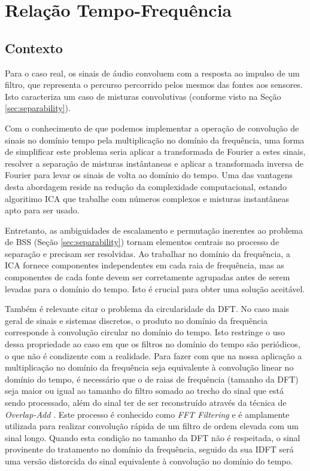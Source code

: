\label{chap:3}

\section{Relação Tempo-Frequência}
    
    \subsection{Contexto}
        Para o caso real, os sinais de áudio convoluem com a resposta ao impulso de um filtro, que representa o percurso percorrido pelos mesmos das fontes aos sensores. Isto caracteriza um caso de misturas convolutivas (conforme visto na Seção \ref{sec:separability}). 
        
        Com o conhecimento de que podemos implementar a operação de convolução de sinais no domínio tempo pela  multiplicação no domínio da frequência, uma forma de simplificar este problema seria aplicar a transformada de Fourier a estes sinais, resolver a separação de misturas instântaneas e aplicar a transformada inversa de Fourier para levar os sinais de volta ao domínio do tempo. Uma das vantagens desta abordagem reside na redução da complexidade computacional, estando algoritimo ICA que trabalhe com números complexos e misturas instantâneas apto para ser usado.
        
        Entretanto, as ambiguidades de escalamento e permutação inerentes ao problema de BSS (Seção \ref{sec:separability}) tornam elementos centrais no processo de separação e precisam ser resolvidas. Ao trabalhar no domínio da frequência, a ICA fornece componentes independentes em cada raia de frequência, mas as componentes de cada fonte devem ser corretamente agrupadas antes de serem levadas para o domínio do tempo. Isto é crucial para obter uma solução aceitável.
        
        Também é relevante citar o problema da circularidade da DFT. No caso mais geral de sinais e sistemas discretos, o produto no domínio da frequência corresponde à convolução circular no domínio do tempo. Isto restringe o uso dessa propriedade ao caso em que os filtros no domínio do tempo são periódicos, o que não é condizente com a realidade. Para fazer com que na nossa aplicação a multiplicação no domínio da frequência seja equivalente à convolução linear no domínio do tempo, é necessário que o de raias de frequência (tamanho da DFT) seja maior ou igual ao tamanho do filtro somado ao trecho do sinal que está sendo processado, além do sinal ter de ser reconstruído através da técnica de \textit{Overlap-Add} \cite{signalprocessing} . Este processo é conhecido como \textit{FFT Filtering} e é amplamente utilizada para realizar convolução rápida de um filtro de ordem elevada com um sinal longo. Quando esta condição no tamanho da DFT não é respeitada, o sinal provinente do tratamento no domínio da frequência, seguido da sua IDFT será uma versão distorcida do sinal equivalente à convolução no domínio do tempo.
        
